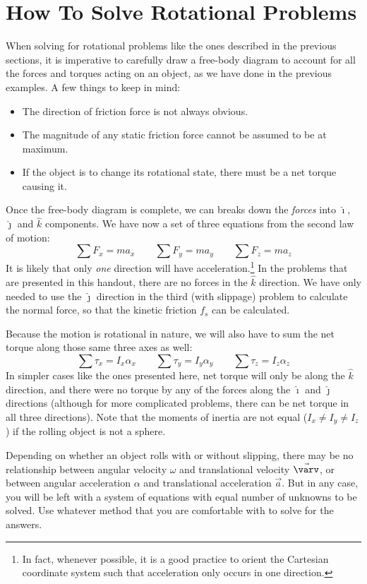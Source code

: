 \documentclass{../../oss-handout}
\newcommand{\iii}{\hat\imath}
\newcommand{\jjj}{\hat\jmath}
\newcommand{\kkk}{\hat k}
\begin{document}
\section{How To Solve Rotational Problems}

When solving for rotational problems like the ones described in the previous
sections, it is imperative to carefully draw a free-body diagram to account for
all the forces and torques acting on an object, as we have done in the previous
examples. A few things to keep in mind:
\begin{itemize}[noitemsep,topsep=0pt]
\item The direction of friction force is not always obvious.
\item The magnitude of any static friction force cannot be assumed to be at
  maximum.
\item If the object is to change its rotational state, there must be a net
  torque causing it.
\end{itemize}
Once the free-body diagram is
complete, we can breaks down the \emph{forces} into $\iii$, $\jjj$ and $\kkk$
components. We have now a set of three equations from the second law of motion:
\begin{equation*}
  \sum F_x=ma_x\quad\quad \sum F_y=ma_y\quad\quad \sum F_z=ma_z
\end{equation*}
It is likely that only \emph{one} direction will have acceleration.\footnote{In
  fact, whenever possible, it is a good practice to orient the Cartesian
  coordinate system such that acceleration only occurs in one direction.} In
the problems that are presented in this handout, there are no forces in the
$\kkk$ direction. We have only needed to use the $\jjj$ direction in the third
(with slippage) problem to calculate the normal force, so that the kinetic
friction $f_s$ can be calculated.

Because the motion is rotational in nature, we will also have to sum the net
torque along those same three axes as well:
\begin{equation*}
  \sum\tau_x=I_x\alpha_x\quad\quad \sum\tau_y=I_y\alpha_y\quad\quad 
  \sum\tau_z=I_z\alpha_z
\end{equation*}
In simpler cases like the ones presented here, net torque will only be along
the $\kkk$ direction, and there were no torque by any of the forces along the
$\iii$ and $\jjj$ directions (although for more complicated problems, there can
be net torque in all three directions). Note that the moments of inertia are
not equal ($I_x\neq I_y\neq I_z$) if the rolling object is not a sphere.

Depending on whether an object rolls with or without slipping, there may be
no relationship between angular velocity $\omega$ and translational velocity
$\vec\varv$, or between angular acceleration $\alpha$ and translational
acceleration $\vec a$. But in any case, you will be left with a system of
equations with equal number of unknowns to be solved. Use whatever method that
you are comfortable with to solve for the answers.
\end{document}

